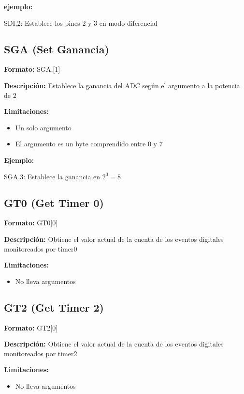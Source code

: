 \documentclass{article}
\theoremstyle{definition}
\theoremstyle{remark}
\begin{document}
\textbf{ejemplo:}

SDI,2: Establece los pines 2 y 3 en modo diferencial

\subsection{SGA (Set Ganancia)} %
\label{sub:sga_set_ganancia}


\textbf{Formato:} SGA,[1]

\textbf{Descripción:}
Establece la ganancia del ADC según el argumento a la potencia de 2

\textbf{Limitaciones:}
\begin{itemize}
  \item Un solo argumento
  \item El argumento es un byte comprendido entre 0 y 7
\end{itemize}

\textbf{Ejemplo:}

SGA,3: Establece la ganancia en $2^{3} = 8$


\subsection{GT0 (Get Timer 0)} %
\label{sub:gt0_get_timer_0}


\textbf{Formato:} GT0[0]

\textbf{Descripción:}
Obtiene el valor actual de la cuenta de los eventos digitales monitoreados por timer0

\textbf{Limitaciones:}
\begin{itemize}
  \item No lleva argumentos
\end{itemize}

\subsection{GT2 (Get Timer 2)} %
\label{sub:gt2_get_timer_2}

\textbf{Formato:} GT2[0]

\textbf{Descripción:}
Obtiene el valor actual de la cuenta de los eventos digitales monitoreados por timer2

\textbf{Limitaciones:}
\begin{itemize}
  \item No lleva argumentos
\end{itemize}
\end{document}
